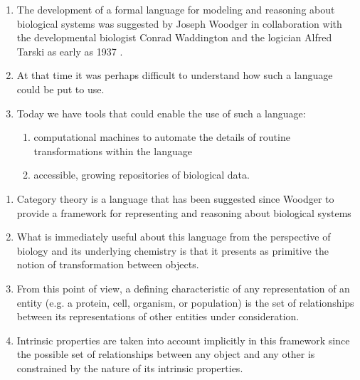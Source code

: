 \begin{frame}
\begin{enumerate}
\item The development of a formal language for modeling and reasoning about biological systems was suggested by Joseph Woodger in collaboration with the developmental biologist Conrad Waddington and the logician Alfred Tarski as early as 1937 \cite{Woodger1937,Woodger1951,Woodger1952,Woodger1952a}. 
\item At that time it was perhaps difficult to understand how such a language could be put to use. 
\item Today we have tools that could enable the use of such a language:
\begin{enumerate}
\item computational machines to automate the details of routine transformations within the language 
\item accessible, growing repositories of biological data.
\end{enumerate} 
\end{enumerate}
\end{frame}

\begin{frame}
\begin{enumerate}
\item Category theory \cite{Lane1985,Lane1998,MacLane1992,Lawvere1997,Lawvere2003,Awodey2006} is a language that has been suggested since Woodger to provide a framework for representing and reasoning about biological systems \cite{Rashevsky1954,Rosen1958,Rosen1958a,Rosen1978,GOGUEN1979,Rosen1985,Rosen1991,Ehresmann2007,Louie2009} 
\item What is immediately useful about this language from the perspective of biology and its underlying chemistry is that it presents as primitive the notion of transformation between objects. 
\item From this point of view, a defining characteristic of any representation of an entity (e.g. a protein, cell, organism, or population) is the set of relationships between its representations of other entities under consideration. 
\item Intrinsic properties are taken into account implicitly in this framework since the possible set of relationships between any object and any other is constrained by the nature of its intrinsic properties. 
\end{enumerate}
\end{frame}

